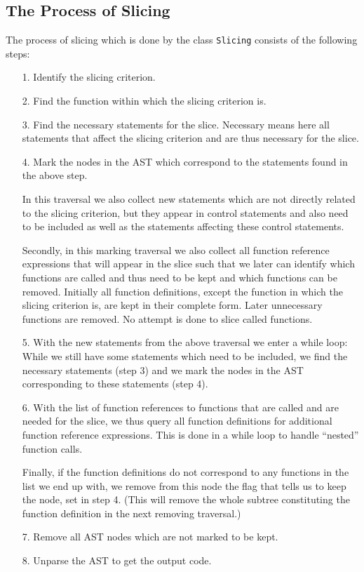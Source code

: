 \documentclass[11pt,a4paper,twoside]{article}
\begin{document}
\subsection{The Process of Slicing}
The process of slicing which is done by the class \texttt{Slicing} consists of the following steps:
\begin{itemize}
\item[1.] Identify the slicing criterion.
\item[2.] Find the function within which the slicing criterion is.
\item[3.] Find the necessary statements for the slice. Necessary means here all statements that affect the slicing criterion and are thus necessary for the slice.
\item[4.] Mark the nodes in the AST which correspond to the statements found in the above step.

In this traversal we also collect new statements which are not directly related to the slicing criterion, but they appear in control statements and also need to be included as well as the statements affecting these control statements.

Secondly, in this marking traversal we also collect all function reference expressions that will appear in the slice such that we later can identify which functions are called and thus need to be kept and which functions can be removed.
Initially all function definitions, except the function in which the slicing criterion is, are kept in their complete form. Later unnecessary functions are removed. No attempt is done to slice called functions.

\item[5.] With the new statements from the above traversal we enter a while loop: While we still have some statements which need to be included, we find the necessary statements (step 3) and we mark the nodes in the AST corresponding to these statements (step 4).
\item[6.] With the list of function references to functions that are called and are needed for the slice, we thus query all function definitions for additional function reference expressions. This is done in a while loop to handle ``nested'' function calls.

Finally, if the function definitions do not correspond to any functions in the list we end up with, we remove from this node the flag that tells us to keep the node, set in step 4. (This will remove the whole subtree constituting the function definition in the next removing traversal.)
\item[7.] Remove all AST nodes which are not marked to be kept.
\item[8.] Unparse the AST to get the output code.
\end{itemize}
\end{document}
